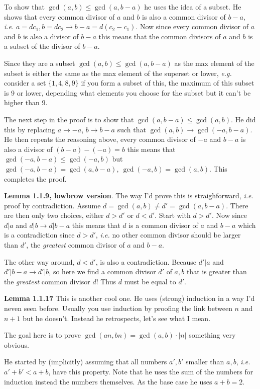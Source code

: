 \documentclass[aps,preprint,preprintnumbers,nofootinbib,showpacs,prd]{revtex4-1}
\newcommand{\ie}{{\it i.e.} }
\newcommand{\eg}{{\it e.g.} }
\begin{document}
To show that $\gcd(a,b) \le \gcd(a,b-a)$ he uses the idea of a subset. He shows that every common divisor of $a$ and $b$ is also a common divisor of $b-a$, \ie $a = d c_1, b=d c_2 \to b-a = d(c_2-c_1)$. Now since every common divisor of $a$ and $b$ is also a divisor of $b-a$ this means that the common divisors of $a$ and $b$ is a subset of the divisor of $b-a$.

Since they are a subset $\gcd(a,b) \le \gcd(a,b-a)$ as the max element of the subset is either the same as the max element of the superset or lower, \eg consider a set $\{1,4,8,9\}$ if you form a subset of this, the maximum of this subset is 9 or lower, depending what elements you choose for the subset but it can't be higher than 9.

The next step in the proof is to show that $\gcd(a,b-a) \le \gcd(a,b)$. He did this by replacing $a \to -a$, $b \to b-a$ such that $\gcd(a,b) \to \gcd(-a, b-a)$. He then repeats the reasoning above, every common divisor of $-a$ and $b-a$ is also a divisor of $(b-a) - (-a) = b$ this means that $\gcd(-a,b-a) \le \gcd(-a,b)$ but $\gcd(-a,b-a) = \gcd(a, b-a),~\gcd(-a,b) = \gcd(a,b)$. This completes the proof.

{\bf Lemma 1.1.9, lowbrow version}. The way I'd prove this is straighforward, \ie proof by contradiction. Assume $d = \gcd(a,b) \neq d' = \gcd(a, b-a)$. There are then only two choices, either $d > d'$ or $d < d'$. Start with $d > d'$. Now since $d|a$ and $d|b \to d | b-a$ this means that $d$ is a common divisor of $a$ and $b-a$ which is a contradiction since $d > d'$, \ie no other common divisor should be larger than $d'$, the {\it greatest} common divisor of $a$ and $b-a$.

The other way around, $d < d'$, is also a contradiction. Because $d'|a$ and $d'|b-a \to d'|b$, so here we find a common divisor $d'$ of $a,b$ that is greater than the {\it greatest} common divisor $d$! Thus $d$ must be equal to $d'$.

{\bf Lemma 1.1.17} This is another cool one. He uses (strong) induction in a way I'd neven seen before. Usually you use induction by proofing the link between $n$ and $n+1$ but he doesn't. Instead he retrospects, let's see what I mean.

The goal here is to prove $\gcd(an,bn) = \gcd(a,b) \cdot |n|$ something very obvious.

He started by (implicitly) assuming that all numbers $a',b'$ smaller than $a,b$, \ie $a'+b' < a+b$, have this property. Note that he uses the sum of the numbers for induction instead the numbers themselves. As the base case he uses $a + b = 2$.
\end{document}
